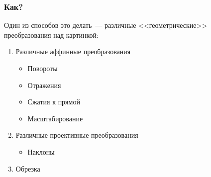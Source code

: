 \documentclass{beamer}
\begin{document}
\begin{frame}
  \frametitle{Как?}
  Один из способов это делать~--- различные <<геометрические>> преобразования над
  картинкой:
  \begin{enumerate}[<+->]
  \item Различные аффинные преобразования
    \begin{itemize}
    \item Повороты
    \item Отражения
    \item Сжатия к прямой
    \item Масштабирование
    \end{itemize}
  \item Различные проективные преобразования
    \begin{itemize}
    \item Наклоны
    \end{itemize}
  \item Обрезка    
  \end{enumerate}
\end{frame}
\end{document}
